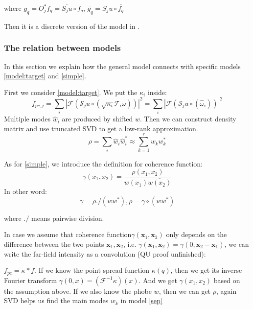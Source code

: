 \documentclass{article}
\numberwithin{equation}{section}
\begin{document}
where $g_q = O_j^*f_q =  \overline{S_ju} \circ f_q$, $\overline{g_q} = S_ju \circ \overline{f_q}$

Then it is a discrete version of the model in \cite{psf}.  

\subsubsection{The relation between models}
 \label{section:reference}
In this section we explain how the general model connects with specific models \eqref{model:target} and \eqref{simple}. 

First we consider \eqref{model:target}. We put the $\kappa_{i}$ inside:
\begin{equation}
f_{p c, j}=\sum_{i} \left|\mathcal{F}\left( \mathcal{S}_{j} u \circ \left( \sqrt{\kappa_{i}}\mathcal{T}_{i} \omega\right) \right)\right|^{2}
=
\sum_{i} \left|\mathcal{F}\left( \mathcal{S}_{j} u \circ \left( \hat{\omega}_i\right) \right)\right|^{2}
\end{equation}
Multiple modes $\hat{w}_i$ are produced by shifted $w$. Then we can construct density matrix and use truncated SVD to get a low-rank approximation. 
$$
\rho = \sum_i \hat{w}_i \hat{w}_i^* \approx \sum_{k=1}^{r} w_k w_k^* 
$$

As for \eqref{simple}, we introduce the definition for coherence function:
$$
\gamma(x_1,x_2) = \dfrac{\rho(x_1,x_2)}{w(x_1) \overline{w(x_2)} }
$$
In other word:
\begin{equation}
\gamma = \rho ./ ( w w^*), \rho = \gamma \circ (ww^*)
\end{equation}



where $./$ means pairwise division.

In case we assume that coherence function$\gamma\left(\mathbf{x}_{1}, \mathbf{x}_{2}\right)$ only depends on the difference between
the two points $\mathbf{x}_{1}, \mathbf{x}_{2}$, i.e. $\gamma\left(\mathbf{x}_{1}, \mathbf{x}_{2}\right)=\gamma\left(0, \mathbf{x}_{2}-\mathbf{x}_{1}\right)$, we can write the far-field intensity as a convolution\cite{psf} (QU proof unfinished):

$f_{pc} = \kappa * f $. If we know the point spread function $\kappa(q)$, then we get its inverse Fourier transform $\gamma(0,x) = (\mathcal{F}^{-1}\kappa)(x)$. And we get $\gamma(x_1,x_2)$ based on the assumption above.  If we also know the phobe $w$, then we can get $\rho$, again SVD helps us find the main modes $w_k$ in model \eqref{sep}
\end{document}
